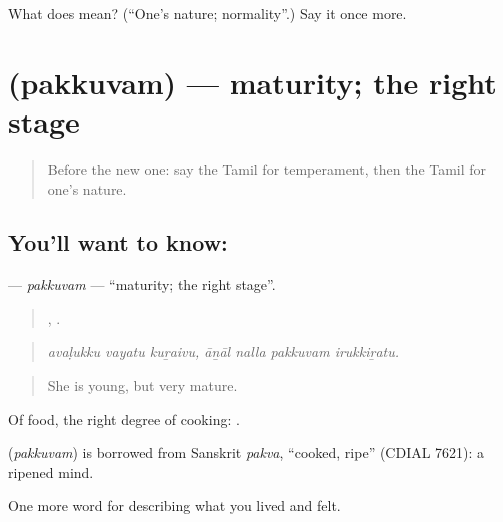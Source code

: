 \begin{tcolorbox}[breakable,colback=teal!4,colframe=teal!35!black,title={Before you move on}]
What does  mean? (\textquotedblleft{}One’s nature; normality\textquotedblright{}.) Say it once more.
\end{tcolorbox}
\section[\texorpdfstring{\ta{பக்குவம்} (pakkuvam)}{பக்குவம் (pakkuvam)}]{ (pakkuvam) — maturity; the right stage}

\label{lesson:TA-C471-pakkuvam}



\begin{quote}
Before the new one: say the Tamil for temperament, then the Tamil for one’s nature.
\end{quote}

\subsection*{You'll want to know: }
\textbf{} — \emph{pakkuvam} — \textquotedblleft{}maturity; the right stage\textquotedblright{}.

\begin{quote}
  ,    .
\end{quote}

\begin{quote}
\emph{avaḷukku vayatu kuṟaivu, āṉāl nalla pakkuvam irukkiṟatu.}
\end{quote}

\begin{quote}
She is young, but very mature.
\end{quote}

Of food, the right degree of cooking:  .

\begin{cousinweb}
\textbf{} (\emph{pakkuvam}) is borrowed from Sanskrit \emph{pakva}, \textquotedblleft{}cooked, ripe\textquotedblright{} (CDIAL 7621): a ripened mind.
\end{cousinweb}

\begin{grammarlens}[title={What you've built}]
One more word for describing what you lived and felt.
\end{grammarlens}

